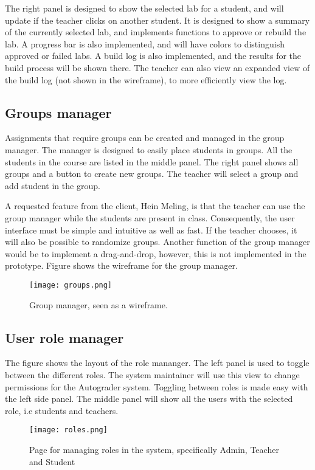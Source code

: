 The right panel is designed to show the selected lab for a student, and will update if the teacher clicks on another student. It is designed to show a summary of the currently selected lab, and implements functions to approve or rebuild the lab. A progress bar is also implemented, and will have colors to distinguish approved or failed labs. A build log is also implemented, and the results for the build process will be shown there. The teacher can also view an expanded view of the build log (not shown in the wireframe), to more efficiently view the log.

\subsection{Groups manager}

Assignments that require groups can be created and managed in the group manager. The manager is designed to easily place students in groups. All the students in the course are listed in the middle panel. The right panel shows all groups and a button to create new groups. The teacher will select a group and add student in the group. 

A requested feature from the client, Hein Meling, is that the teacher can use the group manager while the students are present in class. Consequently, the user interface must be simple and intuitive as well as fast. If the teacher chooses, it will also be possible to randomize groups. Another function of the group manager would be to implement a drag-and-drop, however, this is not implemented in the prototype. Figure  shows the wireframe for the group manager.

\begin{figure}[h!]
	 \centering
   \texttt{[image: groups.png]}
   \caption{Group manager, seen as a wireframe.}
   \label{fig:Wireframes for the new Autograder front-end}
\end{figure}

\subsection{User role manager}

The figure  shows the layout of the role mananger. The left panel is used to toggle between the different roles. The system maintainer will use this view to change permissions for the Autograder system. Toggling between roles is made easy with the left side panel. The middle panel will show all the users with the selected role, i.e students and teachers.

\begin{figure}[h!]
	 \centering
   \texttt{[image: roles.png]}
   \caption{Page for managing roles in the system, specifically Admin, Teacher and Student}
   \label{fig:Wireframes for the new Autograder front-end}
\end{figure}






